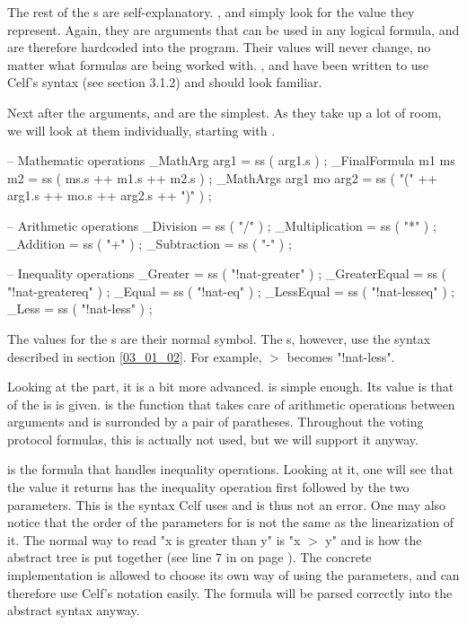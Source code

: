 The rest of the s are self-explanatory. ,  and  simply look for the value they represent. Again, they are arguments that can be used in any logical formula, and are therefore hardcoded into the program. Their values will never change, no matter what formulas are being worked with. , and  have been written to use Celf's syntax (see section 3.1.2) and should look familiar.

Next after the arguments,  and  are the simplest. As they take up a lot of room, we will look at them individually, starting with .

\begin{lstgf}
        -- Mathematic operations
        _MathArg arg1                   = ss ( arg1.s ) ;
        _FinalFormula m1 ms m2          = ss ( ms.s ++ m1.s ++ m2.s ) ;
        _MathArgs arg1 mo arg2          = ss ( "(" ++ arg1.s ++ mo.s ++ arg2.s ++ ")" ) ;

        -- Arithmetic operations
        _Division                       = ss ( "/" ) ;
        _Multiplication                 = ss ( "*" ) ;
        _Addition                       = ss ( "+" ) ;
        _Subtraction                    = ss ( "-" ) ;

        -- Inequality operations
        _Greater                        = ss ( "!nat-greater" ) ;
        _GreaterEqual                   = ss ( "!nat-greatereq" ) ;
        _Equal                          = ss ( "!nat-eq" ) ;
        _LessEqual                      = ss ( "!nat-lesseq" ) ;
        _Less                           = ss ( "!nat-less" ) ;
\end{lstgf}
The values for the s are their normal symbol. The s, however, use the syntax described in section \ref{03_01_02}. For example, $>$ becomes "!nat-less".

Looking at the  part, it is a bit more advanced.  is simple enough. Its value is that of the  is is given.  is the function that takes care of arithmetic operations between arguments and is surronded by a pair of paratheses. Throughout the voting protocol formulas, this is actually not used, but we will support it anyway.

 is the formula that handles inequality operations. Looking at it, one will see that the value it returns has the inequality operation first followed by the two parameters. This is the syntax Celf uses and is thus not an error. One may also notice that the order of the parameters for  is not the same as the linearization of it. The normal way to read "x is greater than y" is "x $>$ y" and is how the abstract tree is put together (see line 7 in  on page \pageref{code:04_01_C04}). The concrete implementation is allowed to choose its own way of using the parameters, and can therefore use Celf's notation easily. The formula will be parsed correctly into the abstract syntax anyway.

